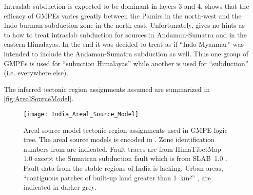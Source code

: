 \documentclass{article}
\begin{document}
Intraslab subduction is expected to be dominant in layers 3 and 4.
\cite{nath2011peak} shows that the efficacy of GMPEs varies greatly between the Pamirs in the north-west and the Indo-burman subduction zone in the north-east. Unfortunately, \cite{nath2012probabilistic} gives no hints as to how to treat intraslab subduction for sources in Andaman-Sumatra and in the eastern Himalayas.
In the end it was decided to treat \cite[Figure~3]{nath2012probabilistic} as if ``Indo-Myanmar'' was intended to include the Andaman-Sumatra subduction as well.
Thus one group of GMPEs is used for ``subuction Himalayas'' while another is used for ``subduction'' (i.e. everywhere else).

The inferred tectonic region assignments assumed are summarized in \autoref{fig:ArealSourceModel}.

\begin{figure}[!htb]
\begin{adjustbox}{center}
\texttt{[image: India\_Areal\_Source\_Model]}
\end{adjustbox}
\caption[Areal source model]{Areal source model tectonic region assignments used in GMPE logic tree.
The areal source models is encoded in \texttt{}.
Zone identification numbers from \cite{nath2012probabilistic} are indicated.
Fault traces are from HimaTibetMap-1.0 \citep{styron2010database} except the Sumatran subduction fault which is from SLAB~1.0 \citep{hayes2012slab1}.
Fault data from the stable regions of India is lacking.
Urban areas, ``contiguous patches of built-up land greater than 1~km²'' \citep{schneider2009new}, are indicated in darker grey.}
\label{fig:ArealSourceModel}
\end{figure}
\end{document}
